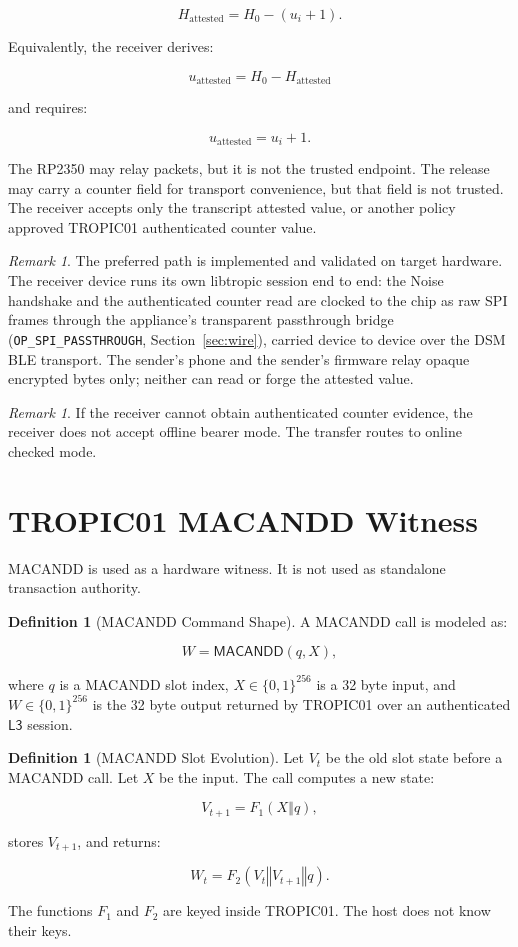 \documentclass[11pt]{article}
\theoremstyle{definition}
\newtheorem{definition}[theorem]{Definition}
\theoremstyle{remark}
\newtheorem{remark}[theorem]{Remark}
\newcommand{\concat}{\ensuremath{\mathbin{\Vert}}}
\newcommand{\bits}{\ensuremath{\{0,1\}}}
\newcommand{\MACD}{\ensuremath{\mathsf{MACANDD}}}
\newcommand{\Lthree}{\ensuremath{\mathsf{L3}}}
\begin{document}
\[
H_{\mathrm{attested}} = H_0-(u_i+1).
\]

Equivalently, the receiver derives:

\[
u_{\mathrm{attested}} = H_0 - H_{\mathrm{attested}}
\]

and requires:

\[
u_{\mathrm{attested}}=u_i+1.
\]

The RP2350 may relay packets, but it is not the trusted endpoint. The release may carry a counter
field for transport convenience, but that field is not trusted. The receiver accepts only the
transcript attested value, or another policy approved TROPIC01 authenticated counter value.

\begin{remark}
The preferred path is implemented and validated on target hardware. The receiver device runs its
own libtropic session end to end: the Noise handshake and the authenticated counter read are
clocked to the chip as raw SPI frames through the appliance's transparent passthrough bridge
(\texttt{OP\_SPI\_PASSTHROUGH}, Section~\ref{sec:wire}), carried device to device over the DSM
BLE transport. The sender's phone and the sender's firmware relay opaque encrypted bytes only;
neither can read or forge the attested value.
\end{remark}

\begin{remark}
If the receiver cannot obtain authenticated counter evidence, the receiver does not accept offline
bearer mode. The transfer routes to online checked mode.
\end{remark}

\section{TROPIC01 MACANDD Witness}

MACANDD is used as a hardware witness. It is not used as standalone transaction authority.

\begin{definition}[MACANDD Command Shape]
A MACANDD call is modeled as:

\[
W=\MACD(q,X),
\]

where \(q\) is a MACANDD slot index, \(X\in\bits^{256}\) is a 32 byte input, and
\(W\in\bits^{256}\) is the 32 byte output returned by TROPIC01 over an authenticated \Lthree
session.
\end{definition}

\begin{definition}[MACANDD Slot Evolution]
Let \(V_t\) be the old slot state before a MACANDD call. Let \(X\) be the input. The call computes
a new state:

\[
V_{t+1}=F_1(X\concat q),
\]

stores \(V_{t+1}\), and returns:

\[
W_t=F_2(V_t\concat V_{t+1}\concat q).
\]

The functions \(F_1\) and \(F_2\) are keyed inside TROPIC01. The host does not know their keys.
\end{definition}
\end{document}
